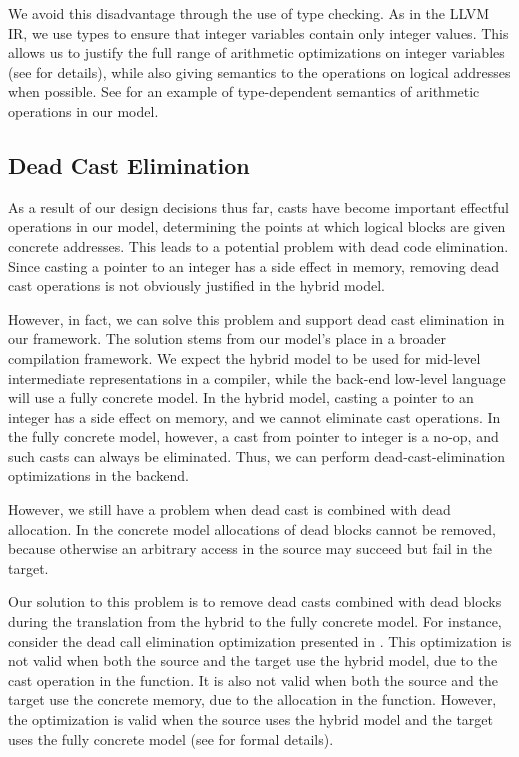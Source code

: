We avoid this disadvantage through the use of type checking. 
As in the LLVM IR, we use types to ensure that integer variables contain only integer values.
This allows us to justify the full range of arithmetic optimizations on integer variables (see  for details), 
while also giving semantics to the operations on logical addresses when possible.
See  for an example of type-dependent semantics of arithmetic operations in our model.

\subsection{Dead Cast Elimination}
\label{idea:deadcast}

As a result of our design decisions thus far, casts have become
important effectful operations in our model, determining the points at
which logical blocks are given concrete addresses. This leads to a
potential problem with dead code elimination.  Since casting a pointer
to an integer has a side effect in memory, removing dead cast
operations is not obviously justified in the hybrid model.

However, in fact,
we can solve this problem and support dead cast elimination in our
framework. 
The solution stems from our model's place in a broader compilation
framework. We expect the hybrid model to be used for mid-level
intermediate representations in a compiler, while the back-end
low-level language will use a fully concrete model. In the
hybrid model, casting a pointer to an integer has a side
effect on memory, and we cannot eliminate cast operations. In the
fully concrete model, however, a cast from pointer to integer is a 
no-op, and such casts can always be eliminated. Thus, we can
perform dead-cast-elimination optimizations in the backend.

However, we still have a problem when dead cast is combined with dead
allocation. In the concrete model allocations of dead blocks cannot be
removed, because otherwise an arbitrary access in the source may
succeed but fail in the target. 

Our solution to this problem is to remove dead casts combined with dead blocks during the
translation from the hybrid to the fully concrete model.  For instance, consider the dead call
elimination optimization presented in . This
optimization is not valid when both the source and the target use the hybrid model, due to the cast
operation in the function. It is also not valid when both the source and the target use the concrete
memory, due to the allocation in the function. However, the optimization is valid when the source
uses the hybrid model and the target uses the fully concrete model (see
 for formal details).

